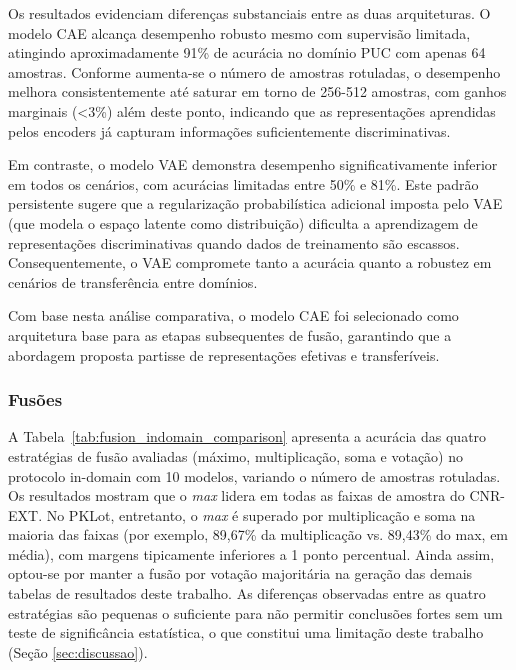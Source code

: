 \documentclass{article}
\begin{document}
Os resultados evidenciam diferenças substanciais entre as duas arquiteturas. O modelo CAE alcança desempenho robusto mesmo com supervisão limitada, atingindo aproximadamente 91\% de acurácia no domínio PUC com apenas 64 amostras. Conforme aumenta-se o número de amostras rotuladas, o desempenho melhora consistentemente até saturar em torno de 256-512 amostras, com ganhos marginais (<3\%) além deste ponto, indicando que as representações aprendidas pelos encoders já capturam informações suficientemente discriminativas.

Em contraste, o modelo VAE demonstra desempenho significativamente inferior em todos os cenários, com acurácias limitadas entre 50\% e 81\%. Este padrão persistente sugere que a regularização probabilística adicional imposta pelo VAE (que modela o espaço latente como distribuição) dificulta a aprendizagem de representações discriminativas quando dados de treinamento são escassos. Consequentemente, o VAE compromete tanto a acurácia quanto a robustez em cenários de transferência entre domínios.

Com base nesta análise comparativa, o modelo CAE foi selecionado como arquitetura base para as etapas subsequentes de fusão, garantindo que a abordagem proposta partisse de representações efetivas e transferíveis.

\subsubsection{Fusões}

 A Tabela~\ref{tab:fusion_indomain_comparison} apresenta a acurácia das quatro estratégias de fusão avaliadas (máximo, multiplicação, soma e votação) no protocolo in-domain com 10 modelos, variando o número de amostras rotuladas. Os resultados mostram que o \textit{max} lidera em todas as faixas de amostra do CNR-EXT. No PKLot, entretanto, o \textit{max} é superado por multiplicação e soma na maioria das faixas (por exemplo, 89,67\% da multiplicação vs. 89,43\% do max, em média), com margens tipicamente inferiores a 1 ponto percentual. Ainda assim, optou-se por manter a fusão por votação majoritária na geração das demais tabelas de resultados deste trabalho. As diferenças observadas entre as quatro estratégias são pequenas o suficiente para não permitir conclusões fortes sem um teste de significância estatística, o que constitui uma limitação deste trabalho (Seção \ref{sec:discussao}).
\end{document}
